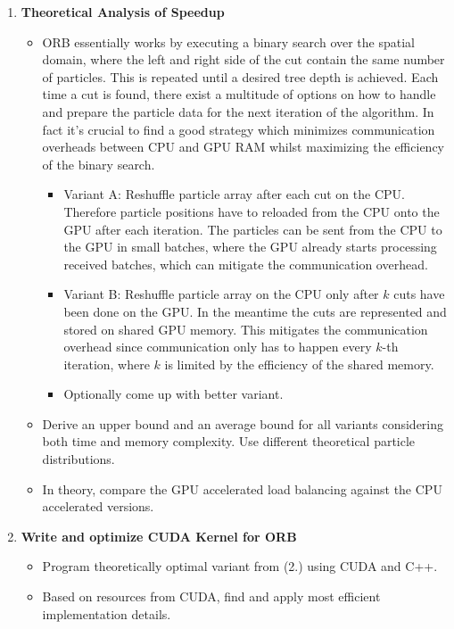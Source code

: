 \documentclass[english]{IFIletter}
\begin{document}
\begin{letter}
\begin{enumerate}
\item \textbf{Theoretical Analysis of Speedup}
\begin{itemize}
    \item ORB essentially works by executing a binary search over the spatial domain, where the left and right side of the cut contain the same number of particles. This is repeated until a desired tree depth is achieved. Each time a cut is found, there exist a multitude of options on how to handle and prepare the particle data for the next iteration of the algorithm. In fact it's crucial to find a good strategy which minimizes communication overheads between CPU and GPU RAM whilst maximizing the efficiency of the binary search.
    \begin{itemize}
        \item Variant A: Reshuffle particle array after each cut on the CPU. Therefore particle positions have to reloaded from the CPU onto the GPU after each iteration. The particles can be sent from the CPU to the GPU in small batches, where the GPU already starts processing received batches, which can mitigate the communication overhead. 
        \item Variant B: Reshuffle particle array on the CPU only after $k$ cuts have been done on the GPU. In the meantime the cuts are represented and stored on shared GPU memory. This mitigates the communication overhead since communication only has to happen every $k$-th iteration, where $k$ is limited by the efficiency of the shared memory.
        \item Optionally come up with better variant. 
    \end{itemize}
    \item  Derive an upper bound and an average bound for all variants  considering both time and memory complexity. Use different theoretical particle distributions. 
    \item In theory, compare the GPU accelerated load balancing against the CPU accelerated versions.
\end{itemize}



\item \textbf{Write and optimize CUDA Kernel for ORB}

  \begin{itemize}
  \item Program theoretically optimal variant from (2.) using CUDA and C++.
  \item Based on resources from CUDA, find and apply most efficient implementation details. 


\end{itemize}
\end{enumerate}
\end{letter}
\end{document}
